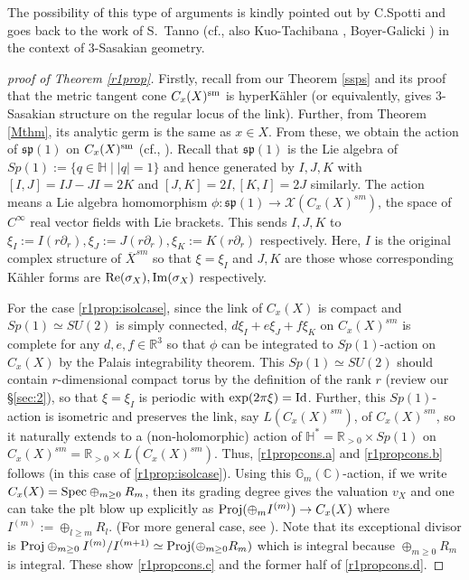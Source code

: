\documentclass[12pt,a4paper]{amsart}
\theoremstyle{remark}
\theoremstyle{definition}
\def\R{\mathbb{R}}
\def\C{\mathbb{C}}
\def\G{\mathbb{G}}
\begin{document}
The possibility of this type of arguments is kindly 
pointed out by C.Spotti and 
goes back to the work of S.~Tanno \cite{Tanno}
(cf., also Kuo-Tachibana \cite{KuoT}, 
Boyer-Galicki 
\cite[Chapter 13]{BoyerGalicki}) in the context of 
$3$-Sasakian geometry. 
\begin{proof}[proof of Theorem \ref{r1prop}]
Firstly, recall from our Theorem \ref{ssps} and its proof that 
the metric tangent cone $C_x(X)^{\rm sm}$ is hyperK\"ahler 
(or equivalently, gives $3$-Sasakian structure on the regular locus of the link). Further, 
from Theorem \ref{Mthm}, its analytic germ is the same as 
$x\in X$. 
From these, 
we obtain the action of $\mathfrak{sp}(1)$ on $C_x(X)^{\rm sm}$
(cf., \cite[13.2.5, 13.3.1]{BoyerGalicki}). 
Recall that $\mathfrak{sp}(1)$ is the Lie algebra of 
$Sp(1):=\{q\in \mathbb{H}\mid |q|=1\}$ and hence 
generated by $I,J,K$ with $[I,J]=IJ-JI=2K$ and 
$[J,K]=2I,[K,I]=2J$ similarly. 
The action means a Lie algebra homomorphism 
$\phi\colon \mathfrak{sp}(1)\to 
\mathcal{X}(C_x(X)^{sm})$, the space of 
$C^\infty$ real vector fields with Lie brackets. 
This sends $I, J, K$ to 
$\xi_I:=I(r\partial_r), \xi_J:=J(r\partial_r), 
\xi_K:=K(r\partial_r)$ respectively. 
Here, $I$ is the original complex structure of $\overline{X}^{sm}$ 
so that $\xi=\xi_I$ 
and $J,K$ are those whose 
corresponding K\"ahler forms are 
${\rm Re}(\sigma_X), {\rm Im}(\sigma_X)$ respectively. 

For the case \eqref{r1prop:isolcase}, 
since the link of $C_x(X)$ is compact and $Sp(1)\simeq SU(2)$ 
is simply connected, 
$d\xi_I+e\xi_J+f\xi_K$ on $C_x(X)^{sm}$ is complete 
for any $d,e,f\in \R^3$ so that $\phi$ can be integrated 
to $Sp(1)$-action on $C_x(X)$ by the 
Palais integrability theorem. 
This $Sp(1)\simeq SU(2)$ 
should contain $r$-dimensional compact torus by the 
definition of the rank $r$ (review our \S \ref{sec:2}), so that 
$\xi=\xi_I$ is periodic with ${\rm exp}(2\pi \xi)={\rm Id}$. 
Further, this $Sp(1)$-action is isometric and preserves the link, say 
$L(C_x(X)^{sm})$, 
of $C_x(X)^{sm}$, so it naturally extends to a (non-holomorphic) action of 
$\mathbb{H}^*=\mathbb{R}_{>0}\times Sp(1)$ on 
$C_x(X)^{sm}=\mathbb{R}_{>0}\times L(C_x(X)^{sm})$. 
Thus,  
\ref{r1propcons.a} and \ref{r1propcons.b} follows (in this case of 
\eqref{r1prop:isolcase}). 
Using this $\G_m(\C)$-action, if we write $C_x(X)={\rm Spec}
\oplus_{m\ge 0}R_m$, then its grading degree gives the valuation $v_X$ and 
one can take the plt blow up explicitly as 
${\rm Proj}(\oplus_m I^{(m)})\to C_x(X)$ 
where $I^{(m)}:=\oplus_{l\ge m}R_l$. 
(For more general case, see \cite{LX.qreg, Blum}). 
Note that its exceptional divisor is 
${\rm Proj}\oplus_{m\ge 0} I^{(m)}/I^{(m+1)}\simeq 
{\rm Proj}(\oplus_{m\ge 0}R_m)$ which is 
integral because $\oplus_{m\ge 0}R_m$ is integral. 
These show 
\ref{r1propcons.c} and the former half of \ref{r1propcons.d}. 


\end{proof}
\end{document}
